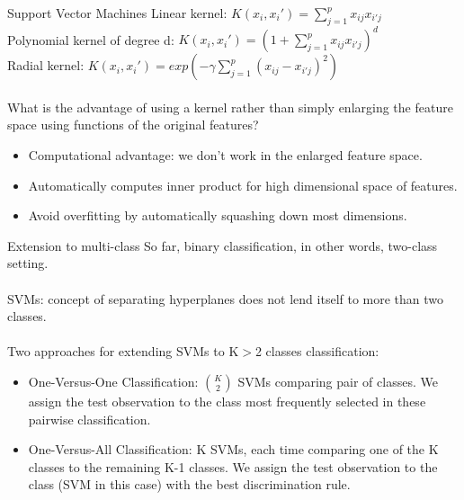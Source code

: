 \documentclass[notes]{beamer}          %
\begin{document}
\begin{frame}{Support Vector Machines}
Linear kernel: $\mathit{K}(x_i,x_i') = \sum_{j=1}^{p} x_{ij} x_{i'j}$ \\
Polynomial kernel of degree d: $\mathit{K}(x_i,x_i') = (1+ \sum_{j=1}^{p} x_{ij} x_{i'j})^d$\\
Radial kernel: $\mathit{K}(x_i,x_i') = exp(- \gamma \sum_{j=1}^{p} (x_{ij}-x_{i'j})^2)$ \\~\\
What is the advantage of using a kernel rather than simply enlarging the feature space using functions of the original features?
\begin{itemize}
 \item Computational advantage: we don't work in the enlarged feature space.
  \item Automatically computes inner product for high dimensional space of features.
  \item Avoid overfitting by automatically squashing down most dimensions.
\end{itemize}
\end{frame}

\begin{frame}{Extension to multi-class}
So far, binary classification, in other words, two-class setting. \\~\\
SVMs: concept of separating hyperplanes does not lend itself to more than two classes. \\~\\
Two approaches for extending SVMs to K$>$2 classes classification:
\begin{itemize}
 \item One-Versus-One Classification: $\binom{K}{2}$ SVMs comparing pair of classes. We assign the test observation to the class most frequently selected in these pairwise classification.
 \item One-Versus-All Classification: K SVMs, each time comparing one of the K classes to the remaining K-1 classes. We assign the test observation to the class (SVM in this case) with the best discrimination rule. 
\end{itemize}
\end{frame}
\end{document}
